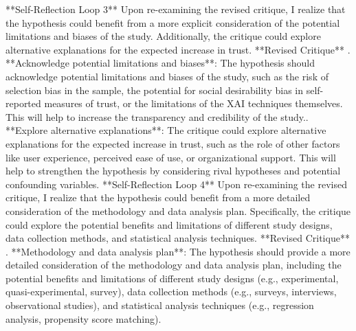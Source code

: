 \documentclass{article}%
\begin{document}
**Self{-}Reflection Loop 3**\newline%
\newline%
Upon re{-}examining the revised critique, I realize that the hypothesis could benefit from a more explicit consideration of the potential limitations and biases of the study. Additionally, the critique could explore alternative explanations for the expected increase in trust.\newline%
\newline%
**Revised Critique**\newline%
. **Acknowledge potential limitations and biases**: The hypothesis should acknowledge potential limitations and biases of the study, such as the risk of selection bias in the sample, the potential for social desirability bias in self{-}reported measures of trust, or the limitations of the XAI techniques themselves. This will help to increase the transparency and credibility of the study.. **Explore alternative explanations**: The critique could explore alternative explanations for the expected increase in trust, such as the role of other factors like user experience, perceived ease of use, or organizational support. This will help to strengthen the hypothesis by considering rival hypotheses and potential confounding variables.\newline%
\newline%
**Self{-}Reflection Loop 4**\newline%
\newline%
Upon re{-}examining the revised critique, I realize that the hypothesis could benefit from a more detailed consideration of the methodology and data analysis plan. Specifically, the critique could explore the potential benefits and limitations of different study designs, data collection methods, and statistical analysis techniques.\newline%
\newline%
**Revised Critique**\newline%
. **Methodology and data analysis plan**: The hypothesis should provide a more detailed consideration of the methodology and data analysis plan, including the potential benefits and limitations of different study designs (e.g., experimental, quasi{-}experimental, survey), data collection methods (e.g., surveys, interviews, observational studies), and statistical analysis techniques (e.g., regression analysis, propensity score matching).\newline%
\end{document}
